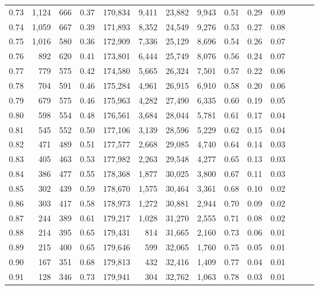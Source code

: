 \begin{tabular}{rrrrrrrrrrrrrr}
0.73 &  1,124 &  666 &  0.37 &  170,834 &    9,411 &  23,882 &   9,943 &  0.51 &  0.29 &      0.09 \\
0.74 &  1,059 &  667 &  0.39 &  171,893 &    8,352 &  24,549 &   9,276 &  0.53 &  0.27 &      0.08 \\
0.75 &  1,016 &  580 &  0.36 &  172,909 &    7,336 &  25,129 &   8,696 &  0.54 &  0.26 &      0.07 \\
0.76 &    892 &  620 &  0.41 &  173,801 &    6,444 &  25,749 &   8,076 &  0.56 &  0.24 &      0.07 \\
0.77 &    779 &  575 &  0.42 &  174,580 &    5,665 &  26,324 &   7,501 &  0.57 &  0.22 &      0.06 \\
0.78 &    704 &  591 &  0.46 &  175,284 &    4,961 &  26,915 &   6,910 &  0.58 &  0.20 &      0.06 \\
0.79 &    679 &  575 &  0.46 &  175,963 &    4,282 &  27,490 &   6,335 &  0.60 &  0.19 &      0.05 \\
0.80 &    598 &  554 &  0.48 &  176,561 &    3,684 &  28,044 &   5,781 &  0.61 &  0.17 &      0.04 \\
0.81 &    545 &  552 &  0.50 &  177,106 &    3,139 &  28,596 &   5,229 &  0.62 &  0.15 &      0.04 \\
0.82 &    471 &  489 &  0.51 &  177,577 &    2,668 &  29,085 &   4,740 &  0.64 &  0.14 &      0.03 \\
0.83 &    405 &  463 &  0.53 &  177,982 &    2,263 &  29,548 &   4,277 &  0.65 &  0.13 &      0.03 \\
0.84 &    386 &  477 &  0.55 &  178,368 &    1,877 &  30,025 &   3,800 &  0.67 &  0.11 &      0.03 \\
0.85 &    302 &  439 &  0.59 &  178,670 &    1,575 &  30,464 &   3,361 &  0.68 &  0.10 &      0.02 \\
0.86 &    303 &  417 &  0.58 &  178,973 &    1,272 &  30,881 &   2,944 &  0.70 &  0.09 &      0.02 \\
0.87 &    244 &  389 &  0.61 &  179,217 &    1,028 &  31,270 &   2,555 &  0.71 &  0.08 &      0.02 \\
0.88 &    214 &  395 &  0.65 &  179,431 &      814 &  31,665 &   2,160 &  0.73 &  0.06 &      0.01 \\
0.89 &    215 &  400 &  0.65 &  179,646 &      599 &  32,065 &   1,760 &  0.75 &  0.05 &      0.01 \\
0.90 &    167 &  351 &  0.68 &  179,813 &      432 &  32,416 &   1,409 &  0.77 &  0.04 &      0.01 \\
0.91 &    128 &  346 &  0.73 &  179,941 &      304 &  32,762 &   1,063 &  0.78 &  0.03 &      0.01 \\

\end{tabular}

